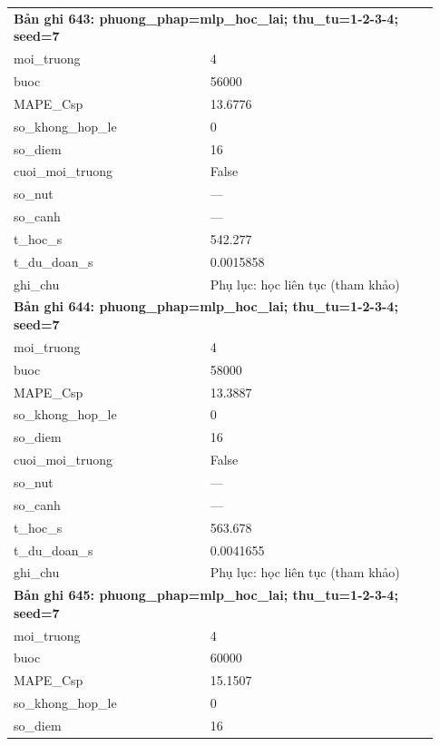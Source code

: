 \begin{longtable}{p{0.43\linewidth}p{0.50\linewidth}}
\midrule
\multicolumn{2}{p{0.95\linewidth}}{\textbf{Bản ghi 643: phuong\_phap=mlp\_hoc\_lai; thu\_tu=1-2-3-4; seed=7}} \\
moi\_\allowbreak truong & 4 \\
buoc & 56000 \\
MAPE\_\allowbreak Csp & 13.6776 \\
so\_\allowbreak khong\_\allowbreak hop\_\allowbreak le & 0 \\
so\_\allowbreak diem & 16 \\
cuoi\_\allowbreak moi\_\allowbreak truong & False \\
so\_\allowbreak nut & — \\
so\_\allowbreak canh & — \\
t\_\allowbreak hoc\_\allowbreak s & 542.277 \\
t\_\allowbreak du\_\allowbreak doan\_\allowbreak s & 0.0015858 \\
ghi\_\allowbreak chu & Phụ lục: học liên tục (tham khảo) \\
\midrule
\multicolumn{2}{p{0.95\linewidth}}{\textbf{Bản ghi 644: phuong\_phap=mlp\_hoc\_lai; thu\_tu=1-2-3-4; seed=7}} \\
moi\_\allowbreak truong & 4 \\
buoc & 58000 \\
MAPE\_\allowbreak Csp & 13.3887 \\
so\_\allowbreak khong\_\allowbreak hop\_\allowbreak le & 0 \\
so\_\allowbreak diem & 16 \\
cuoi\_\allowbreak moi\_\allowbreak truong & False \\
so\_\allowbreak nut & — \\
so\_\allowbreak canh & — \\
t\_\allowbreak hoc\_\allowbreak s & 563.678 \\
t\_\allowbreak du\_\allowbreak doan\_\allowbreak s & 0.0041655 \\
ghi\_\allowbreak chu & Phụ lục: học liên tục (tham khảo) \\
\midrule
\multicolumn{2}{p{0.95\linewidth}}{\textbf{Bản ghi 645: phuong\_phap=mlp\_hoc\_lai; thu\_tu=1-2-3-4; seed=7}} \\
moi\_\allowbreak truong & 4 \\
buoc & 60000 \\
MAPE\_\allowbreak Csp & 15.1507 \\
so\_\allowbreak khong\_\allowbreak hop\_\allowbreak le & 0 \\
so\_\allowbreak diem & 16 \\

\end{longtable}
